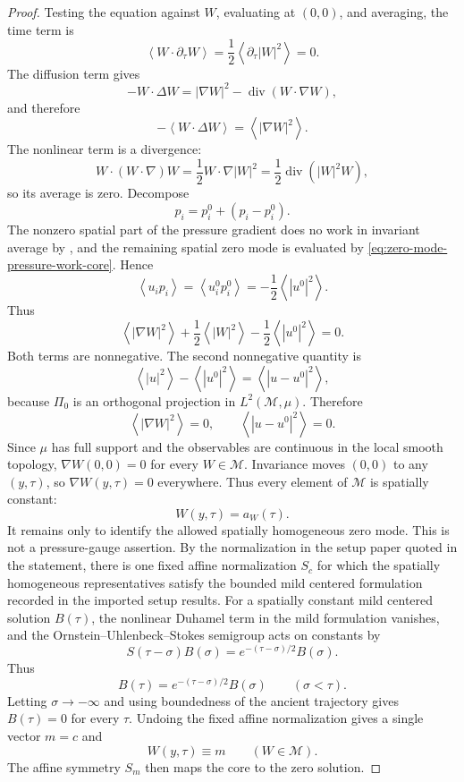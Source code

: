 \documentclass[11pt]{amsart}
\numberwithin{equation}{section}
\theoremstyle{plain}
\theoremstyle{definition}
\theoremstyle{remark}
\newcommand{\divergence}{\operatorname{div}}
\newcommand{\calM}{\mathcal M}
\begin{document}
\begin{proof}
Testing the equation against \(W\), evaluating at \((0,0)\), and averaging, the time
term is
\[
   \left\langle W\cdot\partial_\tau W\right\rangle
   =\frac12\left\langle\partial_\tau |W|^2\right\rangle=0 .
\]
The diffusion term gives
\[
   -W\cdot\Delta W
   =
   |\nabla W|^2-\divergence(W\cdot\nabla W),
\]
and therefore
\[
   -\left\langle W\cdot\Delta W\right\rangle
   =
   \left\langle|\nabla W|^2\right\rangle .
\]
The nonlinear term is a divergence:
\[
   W\cdot(W\cdot\nabla)W
   =
   \frac12W\cdot\nabla |W|^2
   =
   \frac12\divergence(|W|^2W),
\]
so its average is zero.  Decompose
\[
   p_i=p_i^0+(p_i-p_i^0).
\]
The nonzero spatial part of the pressure gradient does no work in invariant
average by , and the remaining
spatial zero mode is evaluated by
\eqref{eq:zero-mode-pressure-work-core}.  Hence
\[
   \left\langle u_ip_i\right\rangle
   =
   \left\langle u_i^0p_i^0\right\rangle
   =
   -\frac12\left\langle|u^0|^2\right\rangle .
\]
Thus
\begin{equation}\label{eq:mean-energy-core}
   \left\langle|\nabla W|^2\right\rangle
   +\frac12\left\langle|W|^2\right\rangle
   -\frac12\left\langle|u^0|^2\right\rangle=0.
\end{equation}
Both terms are nonnegative.  The second nonnegative quantity is
\[
   \left\langle|u|^2\right\rangle-\left\langle|u^0|^2\right\rangle
   =
   \left\langle|u-u^0|^2\right\rangle,
\]
because \(\Pi_0\) is an orthogonal projection in \(L^2(\calM,\mu)\).
Therefore
\[
   \left\langle|\nabla W|^2\right\rangle=0,
   \qquad
   \left\langle|u-u^0|^2\right\rangle=0 .
\]
Since \(\mu\) has full support and the observables are continuous in the local
smooth topology, \(\nabla W(0,0)=0\) for every \(W\in\calM\).  Invariance
moves \((0,0)\) to any \((y,\tau)\), so \(\nabla W(y,\tau)=0\) everywhere.
Thus every element of \(\calM\) is spatially constant:
\[
   W(y,\tau)=a_W(\tau).
\]
It remains only to identify the allowed spatially homogeneous zero mode.  This
is not a pressure-gauge assertion.  By the normalization in the setup paper
quoted in the statement, there is one fixed affine normalization \(S_c\) for which
the spatially homogeneous representatives satisfy the bounded mild centered
formulation recorded in the imported setup results.  For a spatially constant
mild centered solution \(B(\tau)\), the nonlinear Duhamel term in the mild
formulation vanishes, and the Ornstein--Uhlenbeck--Stokes semigroup acts on
constants by
\[
   S(\tau-\sigma)B(\sigma)=e^{-(\tau-\sigma)/2}B(\sigma).
\]
Thus
\[
   B(\tau)=e^{-(\tau-\sigma)/2}B(\sigma)
   \qquad(\sigma<\tau).
\]
Letting \(\sigma\to-\infty\) and using boundedness of the ancient trajectory
gives \(B(\tau)=0\) for every \(\tau\).  Undoing the fixed affine
normalization gives a single vector \(m=c\) and
\[
   W(y,\tau)\equiv m
   \qquad(W\in\calM).
\]
The affine symmetry \(S_m\) then maps the core to the zero solution.
\end{proof}
\end{document}
